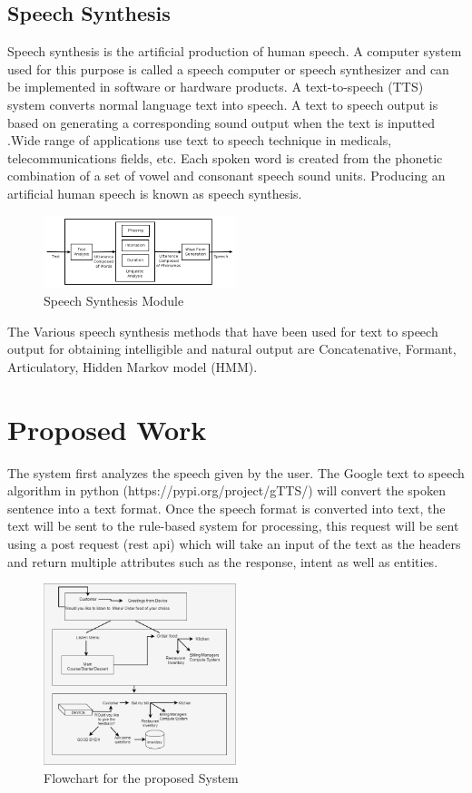 \documentclass[conference]{IEEEtran}
\begin{document}
\subsection{\textbf{Speech Synthesis}}
Speech synthesis is the artificial production of human speech. A computer system used for this purpose is called a speech computer or speech synthesizer and can be implemented in software or hardware products. A text-to-speech (TTS) system converts normal language text into speech. A text to speech output is based on generating a corresponding sound output when the text is inputted \cite{b11}.Wide range of applications use text to speech technique in medicals, telecommunications fields, etc. Each spoken word is created from the phonetic combination of a set of vowel and consonant speech sound units. Producing an artificial human speech is known as speech synthesis.  
\begin{figure}[!ht]
	\centering
	\includegraphics[width=0.5\textwidth]{SpSy.png}
	\caption{Speech Synthesis Module\cite{b12}}
\end{figure}
The Various speech synthesis methods that have been used for text to speech output for obtaining intelligible and natural output are Concatenative, Formant, Articulatory, Hidden Markov model (HMM)\cite{b13}. 


	
	
	\section{Proposed Work}
	The system first analyzes the speech given by the user. The Google text to speech algorithm in python (https://pypi.org/project/gTTS/) will convert the spoken sentence into a text format. Once the speech format is converted into text, the text will be sent to the rule-based system for processing, this request will be sent using a post request (rest api) which will take an input of the text as the headers and return multiple attributes such as the response, intent as well as entities. \\
	
	\begin{figure}[!ht]
		\centering
		\includegraphics[width=0.5\textwidth]{overview.png}
		\caption{ Flowchart for the proposed System}
	\end{figure}
\end{document}
